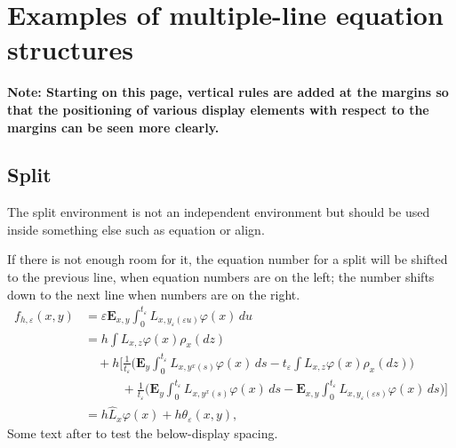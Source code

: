 \documentclass{article}
\newcommand{\ntt}{\normalfont\ttfamily}
\newcommand{\env}[1]{{\protect\ntt#1}}
\theoremstyle{definition}
\theoremstyle{remark}
\newcommand{\wh}{\widehat}
\begin{document}
\newpage
%
%
%
\appendix
\section{Examples of multiple-line equation structures}
\label{s:eq}

\textbf{\large Note: Starting on this page, vertical rules are
added at the margins so that the positioning of various display elements
with respect to the margins can be seen more clearly.}

\subsection{Split}
The \env{split} environment is not an independent environment
but should be used inside something else such as \env{equation}
or \env{align}.

If there is not enough room for it, the equation number for  a
\env{split} will be shifted to the previous line, when equation numbers are
on the left; the number shifts down to the next line when numbers are on
the right.
\begin{equation}
\begin{split}
f_{h,\varepsilon}(x,y)
&=\varepsilon\mathbf{E}_{x,y}\int_0^{t_\varepsilon}
L_{x,y_\varepsilon(\varepsilon u)}\varphi(x)\,du\\
&= h\int L_{x,z}\varphi(x)\rho_x(dz)\\
&\quad+h\biggl[\frac{1}{t_\varepsilon}\biggl(\mathbf{E}_{y}
  \int_0^{t_\varepsilon}L_{x,y^x(s)}\varphi(x)\,ds
  -t_\varepsilon\int L_{x,z}\varphi(x)\rho_x(dz)\biggr)\\
&\phantom{{=}+h\biggl[}+\frac{1}{t_\varepsilon}
  \biggl(\mathbf{E}_{y}\int_0^{t_\varepsilon}L_{x,y^x(s)}
    \varphi(x)\,ds -\mathbf{E}_{x,y}\int_0^{t_\varepsilon}
   L_{x,y_\varepsilon(\varepsilon s)}
   \varphi(x)\,ds\biggr)\biggr]\\
&=h\wh{L}_x\varphi(x)+h\theta_\varepsilon(x,y),
\end{split}
\end{equation}
Some text after to test the below-display spacing.
\end{document}
